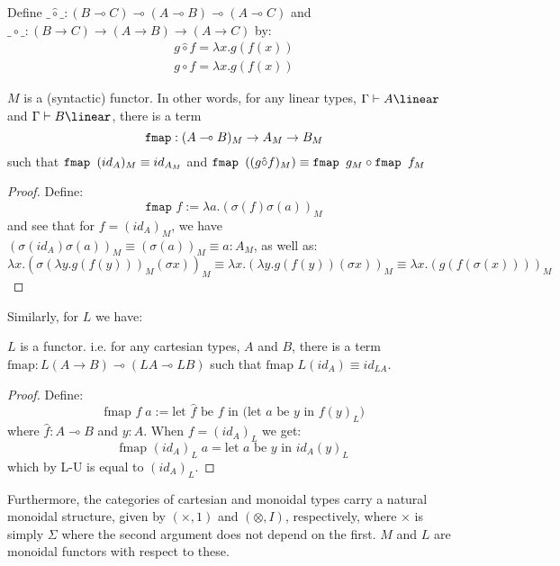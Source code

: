 \begin{defn}\label{syntcomp}Define $\_\hat \circ\_ : (B \multimap C) \multimap (A \multimap B) \multimap (A \multimap C)$ and $\_ \circ\_ : (B \to C) \to (A \to B) \to (A \to C)$ by:
  \[
    \begin{split}
    g \hat \circ f = \lambda x. g(f(x))\\
    g \circ f = \lambda x. g(f(x))
    \end{split}
  \]
\end{defn}

\begin{thm}\label{Mfunc}
  $M$ is a (syntactic) functor. In other words, for any linear types, $\Gamma \vdash A \linear$ and $\Gamma \vdash B \linear$, there is a term
\[
  \textup{\texttt{fmap}} : (A \multimap B)_M \to A_M \to B_M
  \]
such that $\textup{\texttt{fmap }} (id_A)_M \equiv id_{A_M}$ and $\textup{\texttt{fmap }} ((g \hat \circ f)_M) \equiv \textup{\texttt{fmap }} g_M \circ \textup{\texttt{fmap }} f_M$
  \begin{proof}
  Define:
  \[
    \texttt{fmap }f := \lambda a. (\sigma(f)\sigma(a))_M
  \]
  and see that for $f = (id_A)_M$, we have $(\sigma(id_A)\sigma(a))_M \equiv (\sigma(a))_M \equiv a : A_M$, as well as:
  \[
    \lambda x. (\sigma(\lambda y. g(f(y)))_M(\sigma x))_M \equiv \lambda x. (\lambda y. g(f(y))(\sigma x))_M \equiv \lambda x. (g(f(\sigma(x))))_M
  \]
\end{proof}
\end{thm}
Similarly, for $L$ we have:
\begin{thm}
  $L$ is a functor. i.e. for any cartesian types, $A$ and $B$, there is a term $\text{fmap} : L(A \to B) \multimap (LA \multimap LB)$ such that $\text{fmap } L(id_A) \equiv id_{LA}$.
  \begin{proof}
  Define:
  \[
    \text{fmap } f \; a := \text{let $\hat f$ be $f$ in (let $a$ be $y$ in $f(y)_L$)}
  \]
  where $\hat f : A \multimap B$ and $y : A$. When $f = (id_A)_L$ we get:
  \[
    \text{fmap } (id_A)_L \; a = \text{let $a$ be $y$ in $id_A(y)_L$}
  \]
  which by L-U is equal to $(id_A)_L$.
\end{proof}
\end{thm}
Furthermore, the categories of cartesian and monoidal types carry a natural monoidal structure, given by $(\times, 1)$ and $(\otimes, I)$, respectively, where $\times$ is simply $\Sigma$ where the second argument does not depend on the first. $M$ and $L$ are monoidal functors with respect to these.\\

